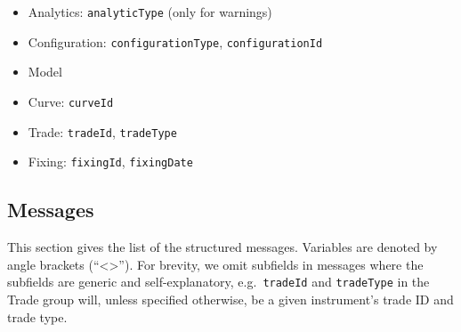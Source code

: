 \begin{itemize}
  \item Analytics: \lstinline!analyticType! (only for warnings)
  \item Configuration: \lstinline!configurationType!, \lstinline!configurationId!
  \item Model
  \item Curve: \lstinline!curveId!
  \item Trade: \lstinline!tradeId!, \lstinline!tradeType!
  \item Fixing: \lstinline!fixingId!, \lstinline!fixingDate!
\end{itemize}


\subsection{Messages}

This section gives the list of the structured messages. Variables are denoted by angle brackets (``<>'').
For brevity, we omit subfields in messages where the subfields are generic and self-explanatory,
e.g.\ \lstinline!tradeId! and \lstinline!tradeType! in the Trade group will, unless specified otherwise,
be a given instrument's trade ID and trade type.

